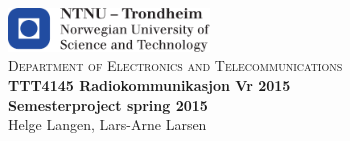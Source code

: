 \begin{titlepage}

	\begin{center}~
		\\[5cm]

		\includegraphics[width=0.4\textwidth]{./img/logontnu}~
		\\[0.3cm]
		\textsc{ Department of Electronics and Telecommunications}~
		\\[2cm]

		{ \huge \bfseries TTT4145 Radiokommunikasjon V\a r 2015 \\[0.5cm]
		Semesterproject spring 2015 }~
		\\[1.5cm]
		

		{ \LARGE Helge Langen, Lars-Arne Larsen}
	\end{center}


\end{titlepage}
